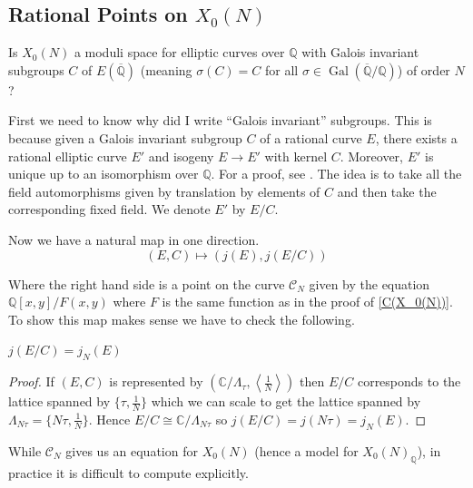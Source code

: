 \documentclass[11pt]{article}
\newcommand{\BB}[1]{\mathbb{#1}} %
\newcommand{\script}[1]{\mathcal{#1}} %
\newcommand{\free}[1]{\left\langle#1\right\rangle} %
\newcommand{\CC}{\BB{C}}
\newcommand{\QQ}{\BB{Q}}
\newcommand{\Gal}{\operatorname{Gal}}
\theoremstyle{plain}
\theoremstyle{remark}
\begin{document}
\subsection{Rational Points on $X_0(N)$}

\begin{quest}
	Is $X_0(N)$ a moduli space for elliptic curves over $\QQ$ with Galois invariant subgroups $C$ of $E(\overline{\QQ})$ (meaning $\sigma(C) = C$ for all $\sigma\in\Gal(\overline{\QQ}/\QQ)$) of order $N$?
\end{quest}

First we need to know why did I write ``Galois invariant'' subgroups. This is because given a Galois invariant subgroup $C$ of a rational curve $E$, there exists a rational elliptic curve $E'$ and isogeny $E\to E'$ with kernel $C$. Moreover, $E'$ is unique up to an isomorphism over $\QQ$. For a proof, see \cite[Chaptr III Ex 3.13e]{silverman1}. The idea is to take all the field automorphisms given by translation by elements of $C$ and then take the corresponding fixed field. We denote $E'$ by $E/C$.

Now we have a natural map in one direction.
\begin{equation}\label{eq:X_0jmap}
(E,C) \mapsto (j(E),j(E/C))
\end{equation}

Where the right hand side is a point on the curve $\script{C}_N$ given by the equation $\QQ[x,y]/F(x,y)$ where $F$ is the same function as in the proof of \autoref{C(X_0(N))}. To show this map makes sense we have to check the following.

\begin{prop}
	$j(E/C) = j_N(E)$
\end{prop}
\begin{proof}
	If $(E,C)$ is represented by $\left(\CC/\Lambda_{\tau},\free{\frac{1}{N}}\right)$ then $E/C$ corresponds to the lattice spanned by $\{\tau,\frac{1}{N}\}$ which we can scale to get the lattice spanned by $\Lambda_{N\tau} = \{N\tau,\frac{1}{N}\}$. Hence $E/C \cong \CC/\Lambda_{N\tau}$ so $j(E/C) = j(N\tau) = j_N(E)$.
\end{proof}

\begin{rem}
While $\script{C}_N$ gives us an equation for $X_0(N)$ (hence a model for $X_0(N)_{\QQ}$), in practice it is difficult to compute explicitly.
\end{rem}
\end{document}
